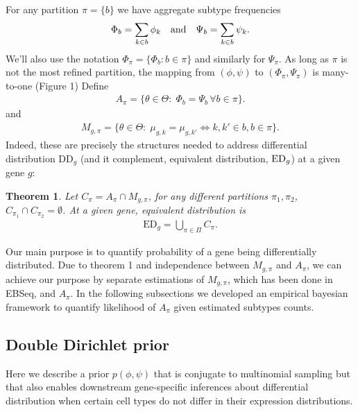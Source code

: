\documentclass[11pt]{amsart}
\newtheorem{theorem}{Theorem}
\begin{document}
For any partition $\pi=\{b\}$ we have aggregate subtype frequencies
\begin{eqnarray*}
\Phi_b = \sum_{k\in b} \phi_k \quad {\mbox {\rm  and}} \quad 
 \Psi_b = \sum_{k\in b} \psi_k.
\end{eqnarray*}
We'll also use the notation $\Phi_\pi = \{ \Phi_b: b \in \pi \}$ and similarly
for $\Psi_\pi$.   As long as $\pi$ is not the most refined partition,
the mapping from $( \phi, \psi )$ to $( \Phi_\pi, \Psi_\pi)$ is many-to-one (Figure 1)
Define
\begin{eqnarray*}
A_\pi = \{ \theta\in \Theta: \; \Phi_b = \Psi_b  \, \forall b \in \pi \}.
\end{eqnarray*}
and
\begin{eqnarray*}
M_{g,\pi} = \{ \theta \in \Theta: \; \mu_{g,k} = \mu_{g,k'} \iff k,k' \in b, b \in \pi \}.
\end{eqnarray*}
Indeed, these are precisely the
structures needed to address differential distribution DD$_g$ (and
it complement, equivalent distribution, ${\rm ED}_g$) at a given gene
$g$: 

\begin{theorem}  Let $C_\pi = A_\pi\cap M_{g, \pi}$,  for any different partitions $\pi_1,\pi_2$, $C_{\pi_1} \cap C_{\pi_2} = \emptyset$. At a given gene, equivalent distribution is
\begin{eqnarray*}
\text{ED}_g = \bigcup_{\pi \in \Pi} C_\pi.
\end{eqnarray*}
\end{theorem}
 
Our main purpose is to quantify probability of a gene being differentially distributed. Due to theorem 1 and independence between $M_{g, \pi}$ and $A_\pi$, we can achieve our purpose by separate estimations of $M_{g,\pi}$, which has been done in EBSeq\cite{ref:Leng}, and $A_\pi$.
In the following subsections we developed an empirical bayesian framework to quantify likelihood of $A_\pi$ given estimated subtypes counts. 


\subsection{Double Dirichlet prior}


Here we describe a prior $p(\phi,\psi)$ that is conjugate to multinomial
sampling but that also enables downstream gene-specific inferences about
differential distribution when certain 
cell types do not differ in their expression
distributions.  
\end{document}
